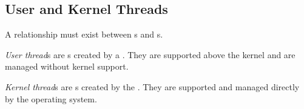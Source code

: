 \subsection{User and Kernel Threads}\label{subsec:User_Kernel_Threads}
A relationship must exist between s and s.
\begin{definition}\label{def:User_Thread}
  \emph{User thread}s are s created by a  .
  They are supported above the kernel and are managed without kernel support.
\end{definition}

\begin{definition}\label{def:Kernel_Thread}
  \emph{Kernel thread}s are s created by the .
  They are supported and managed directly by the operating system.
\end{definition}


